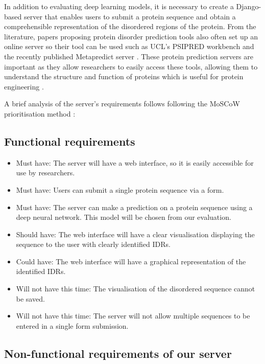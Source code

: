 \documentclass{l4proj}
\begin{document}
In addition to evaluating deep learning models, it is necessary to create a Django-based server that enables users to submit a protein sequence and obtain a comprehensible representation of the disordered regions of the protein. From the literature, papers proposing protein disorder prediction tools also often set up an online server so their tool can be used such as UCL's PSIPRED workbench \citep{DISOPRED:server} and the recently published Metapredict server \citep{Metapredict:server}. These protein prediction servers are important as they allow researchers to easily access these tools, allowing them to understand the structure and function of proteins which is useful for protein engineering \citep{prot_engineering:wiki}. 

A brief analysis of the server’s requirements follows following the MoSCoW prioritisation method \citep{moscow}: 
\subsection{Functional requirements}

\begin{itemize}    
    \item Must have: The server will have a web interface, so it is easily accessible for use by researchers.
    \item Must have: Users can submit a single protein sequence via a form.
    \item Must have: The server can make a prediction on a protein sequence using a deep neural network. This model will be chosen from our evaluation.
    \item Should have: The web interface will have a clear visualisation displaying the sequence to the user with clearly identified IDRs.
    \item Could have: The web interface will have a graphical representation of the identified IDRs.
    \item Will not have this time: The visualisation of the disordered sequence cannot be saved.
    \item Will not have this time: The server will not allow multiple sequences to be entered in a single form submission.
\end{itemize}

\subsection{Non-functional requirements of our server}
\end{document}
